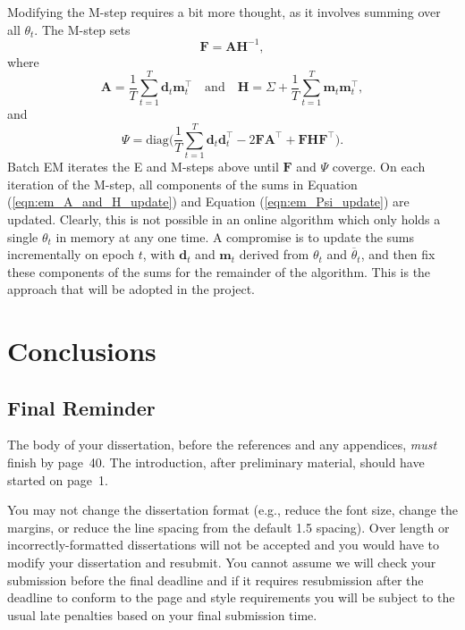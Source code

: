 \documentclass[msc,deptreport.inf]{infthesis} %
\newcommand{\matr}[1]{\mathbf{#1}}
\begin{document}
Modifying the M-step requires a bit more thought, as it involves summing over all $\theta_t$. The M-step sets
\begin{equation}
	\matr{F} = \matr{A}\matr{H}^{-1},
\end{equation}
where
\begin{equation}\label{eqn:em_A_and_H_update}
	\matr{A} = \frac{1}{T} \sum_{t=1}^T \matr{d}_t \matr{m}_t^\intercal \quad \text{and} \quad 
	\matr{H} = \Sigma + \frac{1}{T} \sum_{t=1}^T \matr{m}_t \matr{m}_t^\intercal,
\end{equation}
and
\begin{equation}\label{eqn:em_Psi_update}
	\Psi = \text{diag}\Bigg( \frac{1}{T} \sum_{t=1}^T \matr{d}_t \matr{d}_t^\intercal - 2\matr{FA}^\intercal + \matr{FHF}^\intercal \Bigg).
\end{equation}
Batch EM iterates the E and M-steps above until $\matr{F}$ and $\Psi$ coverge. On each iteration of the M-step, all components of the sums in Equation (\ref{eqn:em_A_and_H_update}) and Equation (\ref{eqn:em_Psi_update}) are updated. Clearly, this is not possible in an online algorithm which only holds a single $\theta_t$ in memory at any one time. A compromise is to update the sums incrementally on epoch $t$, with $\matr{d}_t$ and $\matr{m}_t$ derived from $\theta_t$ and $\overline{\theta}_t$, and then fix these components of the sums for the remainder of the algorithm. This is the approach that will be adopted in the project. 




\chapter{Conclusions}

\section{Final Reminder}

The body of your dissertation, before the references and any appendices,
\emph{must} finish by page~40. The introduction, after preliminary material,
should have started on page~1.

You may not change the dissertation format (e.g., reduce the font
size, change the margins, or reduce the line spacing from the default
1.5 spacing). Over length or incorrectly-formatted dissertations will
not be accepted and you would have to modify your dissertation and
resubmit.  You cannot assume we will check your submission before the
final deadline and if it requires resubmission after the deadline to
conform to the page and style requirements you will be subject to the
usual late penalties based on your final submission time.
\end{document}
